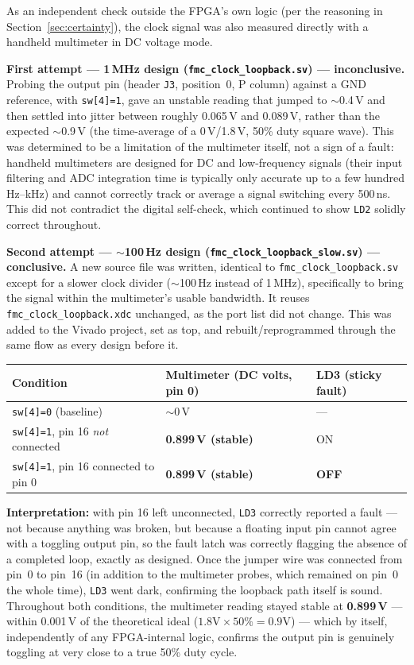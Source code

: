 \documentclass[11pt]{article}
\begin{document}
As an independent check outside the FPGA's own logic (per the reasoning in
Section~\ref{sec:certainty}), the clock signal was also measured directly with a
handheld multimeter in DC voltage mode.

\textbf{First attempt --- 1\,MHz design (\texttt{fmc\_clock\_loopback.sv}) --- inconclusive.}
Probing the output pin (header \texttt{J3}, position~0, P column) against a GND
reference, with \texttt{sw[4]=1}, gave an unstable reading that jumped to $\sim$0.4\,V and
then settled into jitter between roughly 0.065\,V and 0.089\,V, rather than the expected
$\sim$0.9\,V (the time-average of a 0\,V/1.8\,V, 50\% duty square wave). This was
determined to be a limitation of the multimeter itself, not a sign of a fault: handheld
multimeters are designed for DC and low-frequency signals (their input filtering and ADC
integration time is typically only accurate up to a few hundred Hz–kHz) and cannot
correctly track or average a signal switching every 500\,ns. This did not contradict the
digital self-check, which continued to show \texttt{LD2} solidly correct throughout.

\textbf{Second attempt --- $\sim$100\,Hz design (\texttt{fmc\_clock\_loopback\_slow.sv})
--- conclusive.} A new source file was written, identical to
\texttt{fmc\_clock\_loopback.sv} except for a slower clock divider
($\sim$100\,Hz instead of 1\,MHz), specifically to bring the signal within the
multimeter's usable bandwidth. It reuses \texttt{fmc\_clock\_loopback.xdc} unchanged, as
the port list did not change. This was added to the Vivado project, set as top, and
rebuilt/reprogrammed through the same flow as every design before it.

\begin{center}
\begin{tabular}{@{}lll@{}}
\toprule
\textbf{Condition} & \textbf{Multimeter (DC volts, pin 0)} & \textbf{LD3 (sticky fault)} \\
\midrule
\texttt{sw[4]=0} (baseline) & $\sim$0\,V & --- \\
\texttt{sw[4]=1}, pin 16 \emph{not} connected & \textbf{0.899\,V (stable)} & ON \\
\texttt{sw[4]=1}, pin 16 connected to pin 0 & \textbf{0.899\,V (stable)} & \textbf{OFF} \\
\bottomrule
\end{tabular}
\end{center}

\textbf{Interpretation:} with pin 16 left unconnected, \texttt{LD3} correctly reported a
fault --- not because anything was broken, but because a floating input pin cannot agree
with a toggling output pin, so the fault latch was correctly flagging the absence of a
completed loop, exactly as designed. Once the jumper wire was connected from pin~0 to
pin~16 (in addition to the multimeter probes, which remained on pin~0 the whole time),
\texttt{LD3} went dark, confirming the loopback path itself is sound. Throughout both
conditions, the multimeter reading stayed stable at \textbf{0.899\,V} --- within
0.001\,V of the theoretical ideal ($1.8\text{V} \times 50\% = 0.9\text{V}$) --- which by
itself, independently of any FPGA-internal logic, confirms the output pin is genuinely
toggling at very close to a true 50\% duty cycle.
\end{document}
